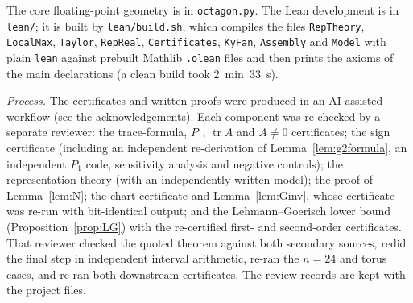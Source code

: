 \documentclass[11pt]{amsart}
\theoremstyle{definition}
\theoremstyle{remark}
\newcommand{\tr}{\operatorname{tr}}
\begin{document}
The core floating-point geometry is in \texttt{octagon.py}. The Lean development is in
\texttt{lean/}; it is built by \texttt{lean/build.sh}, which compiles the files
\texttt{RepTheory}, \texttt{LocalMax}, \texttt{Taylor}, \texttt{RepReal}, \texttt{Certificates},
\texttt{KyFan}, \texttt{Assembly} and \texttt{Model} with plain \texttt{lean} against prebuilt Mathlib
\texttt{.olean} files and then prints the axioms of the main declarations (a clean build took
2~min~33~s).

\emph{Process.} The certificates and written proofs were produced in an AI-assisted workflow
(see the acknowledgements). Each component was re-checked by a separate reviewer: the
trace-formula, $P_1$, $\tr A$ and $A\ne0$ certificates; the sign certificate (including an
independent re-derivation of Lemma~\ref{lem:g2formula}, an independent $P_1$ code, sensitivity
analysis and negative controls); the representation theory (with an independently written model);
the proof of Lemma~\ref{lem:N}; the chart certificate and Lemma~\ref{lem:Ginv}, whose
certificate was re-run with bit-identical output; and the Lehmann--Goerisch lower bound
(Proposition~\ref{prop:LG}) with the re-certified first- and second-order certificates. That
reviewer checked the quoted theorem against both secondary sources, redid the final step in
independent interval arithmetic, re-ran the $n=24$ and torus cases, and re-ran both downstream
certificates. The review records are kept with the project files.



\end{document}
